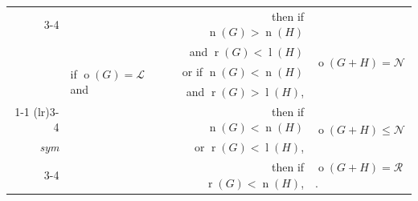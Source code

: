 \documentclass[11pt]{article}
\theoremstyle{definition}
\DeclareMathOperator{\outcome}{o}
\DeclareMathOperator{\ltp}{l}
\DeclareMathOperator{\ntp}{n}
\DeclareMathOperator{\rtp}{r}
\begin{document}
\begin{table}
\begin{tabular}{r|lrl}
    \cmidrule(lr){3-4}
    &  & then if $\ntp(G)>\ntp(H)$ &  \\
    &  & and $\rtp(G)<\ltp(H)$ & \multirow{2}{*}{$\outcome(G+H)=\mathscr{N}$}
    \\
    & \multirow{2}{*}{if $\outcome(G)=\mathscr{L}$ and} & or if
    $\ntp(G)<\ntp(H)$ &
    \\
    & \multirow{2}{*}{$~~~\outcome(H)=\mathscr{R}$} & and $\rtp(G)>\ltp(H)$, &
    \\
    \cmidrule(l){1-1} \cmidrule(lr){3-4}
    \multirow{3}{*}{\cref{lem:14}} & & then if $\ntp(G)<\ntp(H)$ &
    \multirow{2}{*}{$\outcome(G+H)\leq\mathscr{N}$}\\
    \multirow{2.25}{*}{{\footnotesize \it ~sym}}&  & or $\rtp(G)<\ltp(H)$, &\\
    \cmidrule(lr){3-4}
    & & then if $\rtp(G)<\ntp(H)$, &
    $\outcome(G+H)=\mathscr{R}$. \\
    \hline
    \hline
\end{tabular}
\label{tab:11-14}
\end{table}
\end{document}
